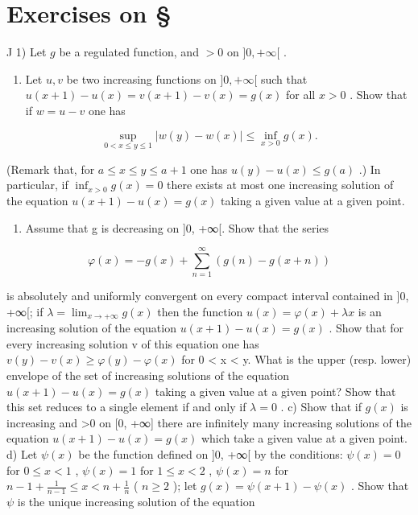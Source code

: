 \section*{Exercises on \S{}}
{}

J 1) Let \(g\) be a regulated function, and \(>0\) on \(]0, +\infty[\) .

\begin{enumerate}
\def\labelenumi{\alph{enumi})}
\tightlist
\item
  Let \(u, v\) be two increasing functions on \(]0, +\infty[\) such that \(u(x + 1) - u(x) = v(x + 1) - v(x) = g(x)\) for all \(x > 0\) . Show that if \(w = u - v\) one has
\end{enumerate}

\[
\sup _ {0 <   x \leqslant y \leqslant 1} | w (y) - w (x) | \leqslant \inf _ {x > 0} g (x).
\]

(Remark that, for \(a \leqslant x \leqslant y \leqslant a + 1\) one has \(u(y) - u(x) \leqslant g(a)\) .) In particular, if \(\inf_{x > 0} g(x) = 0\) there exists at most one increasing solution of the equation \(u(x + 1) - u(x) = g(x)\) taking a given value at a given point.

\begin{enumerate}
\def\labelenumi{\alph{enumi})}
\setcounter{enumi}{1}
\tightlist
\item
  Assume that g is decreasing on {]}0, +∞{[}. Show that the series
\end{enumerate}

\[
\varphi (x) = - g (x) + \sum_ {n = 1} ^ {\infty} (g (n) - g (x + n))
\]

is absolutely and uniformly convergent on every compact interval contained in {]}0, +∞{[}; if \(\lambda = \lim_{x \to +\infty} g(x)\) then the function \(u(x) = \varphi(x) + \lambda x\) is an increasing solution of the equation \(u(x+1) - u(x) = g(x)\) . Show that for every increasing solution v of this equation one has \(v(y) - v(x) \geqslant \varphi(y) - \varphi(x)\) for 0 \textless{} x \textless{} y. What is the upper (resp. lower) envelope of the set of increasing solutions of the equation \(u(x+1) - u(x) = g(x)\) taking a given value at a given point? Show that this set reduces to a single element if and only if \(\lambda = 0\) . c) Show that if \(g(x)\) is increasing and \textgreater0 on {[}0, +∞{]} there are infinitely many increasing solutions of the equation \(u(x+1) - u(x) = g(x)\) which take a given value at a given point. d) Let \(\psi(x)\) be the function defined on {]}0, +∞{[} by the conditions: \(\psi(x)=0\) for \(0\leqslant x<1\) , \(\psi(x)=1\) for \(1\leqslant x<2\) , \(\psi(x)=n\) for \(n-1+\frac{1}{n-1}\leqslant x<n+\frac{1}{n}\) ( \(n\geqslant2\) ); let \(g(x)=\psi(x+1)-\psi(x)\) . Show that \(\psi\) is the unique increasing solution of the equation

